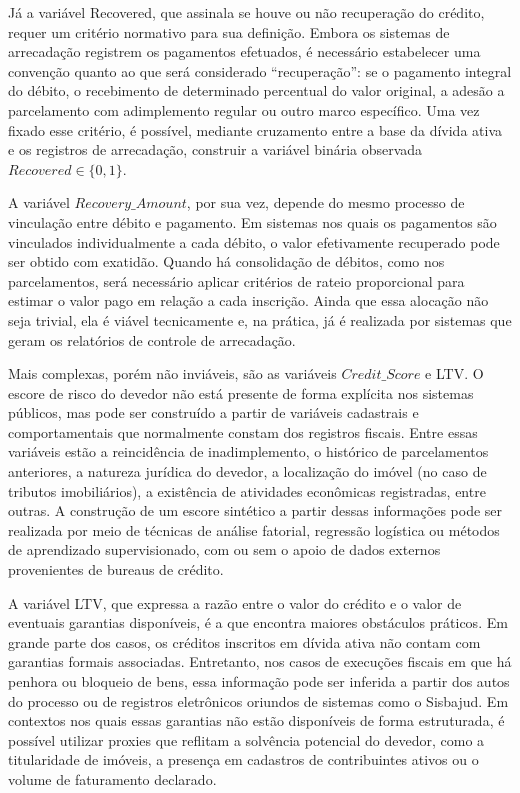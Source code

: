 \documentclass[a4paper,12pt]{article}
\begin{document}
Já a variável Recovered, que assinala se houve ou não recuperação do crédito, requer um critério normativo para sua definição. Embora os sistemas de arrecadação registrem os pagamentos efetuados, é necessário estabelecer uma convenção quanto ao que será considerado “recuperação”: se o pagamento integral do débito, o recebimento de determinado percentual do valor original, a adesão a parcelamento com adimplemento regular ou outro marco específico. Uma vez fixado esse critério, é possível, mediante cruzamento entre a base da dívida ativa e os registros de arrecadação, construir a variável binária observada 
$Recovered \in \{0,1\}$.

A variável $Recovery\_Amount$, por sua vez, depende do mesmo processo de vinculação entre débito e pagamento. Em sistemas nos quais os pagamentos são vinculados individualmente a cada débito, o valor efetivamente recuperado pode ser obtido com exatidão. Quando há consolidação de débitos, como nos parcelamentos, será necessário aplicar critérios de rateio proporcional para estimar o valor pago em relação a cada inscrição. Ainda que essa alocação não seja trivial, ela é viável tecnicamente e, na prática, já é realizada por sistemas que geram os relatórios de controle de arrecadação.

Mais complexas, porém não inviáveis, são as variáveis $Credit\_Score$ e LTV. O escore de risco do devedor não está presente de forma explícita nos sistemas públicos, mas pode ser construído a partir de variáveis cadastrais e comportamentais que normalmente constam dos registros fiscais. Entre essas variáveis estão a reincidência de inadimplemento, o histórico de parcelamentos anteriores, a natureza jurídica do devedor, a localização do imóvel (no caso de tributos imobiliários), a existência de atividades econômicas registradas, entre outras. A construção de um escore sintético a partir dessas informações pode ser realizada por meio de técnicas de análise fatorial, regressão logística ou métodos de aprendizado supervisionado, com ou sem o apoio de dados externos provenientes de bureaus de crédito.

A variável LTV, que expressa a razão entre o valor do crédito e o valor de eventuais garantias disponíveis, é a que encontra maiores obstáculos práticos. Em grande parte dos casos, os créditos inscritos em dívida ativa não contam com garantias formais associadas. Entretanto, nos casos de execuções fiscais em que há penhora ou bloqueio de bens, essa informação pode ser inferida a partir dos autos do processo ou de registros eletrônicos oriundos de sistemas como o Sisbajud. Em contextos nos quais essas garantias não estão disponíveis de forma estruturada, é possível utilizar proxies que reflitam a solvência potencial do devedor, como a titularidade de imóveis, a presença em cadastros de contribuintes ativos ou o volume de faturamento declarado.
\end{document}
